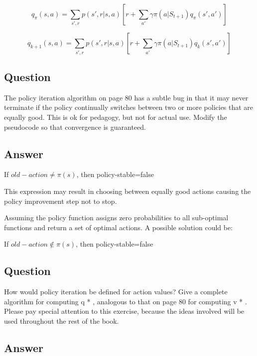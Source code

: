 \documentclass[11pt]{article}
\begin{document}
    \begin{equation}
        q_{\pi}(s, a) = \sum_{s',r} p(s', r | s, a) [r + \sum_{a'} \gamma \pi(a|S_{t+1}) q_\pi(s', a')]
    \end{equation}

    \begin{equation}
        q_{k+1}(s, a) = \sum_{s',r} p(s', r | s, a) [r + \sum_{a'} \gamma \pi(a|S_{t+1}) q_k(s', a')]
    \end{equation}

    \subsection{Question}

    The policy iteration algorithm on page 80 has a subtle bug in that it may never terminate if the policy continually switches between two or more policies that are equally good.
    This is ok for pedagogy, but not for actual use.
    Modify the pseudocode so that convergence is guaranteed.

    \subsection*{Answer}

    If $old-action \neq \pi(s)$, then policy-stable=false

    This expression may result in choosing between equally good actions causing the policy improvement step not to stop.

    Assuming the policy function assigns zero probabilities to all sub-optimal functions and return a set of optimal actions. A possible solution could be:

    If $old-action \notin \pi(s)$, then policy-stable=false

    \subsection{Question}

    How would policy iteration be defined for action values?
    Give a complete algorithm for computing q * , analogous to that on page 80 for computing v * .
    Please pay special attention to this exercise, because the ideas involved will be used throughout the rest of the book.

    \subsection*{Answer}
\end{document}
